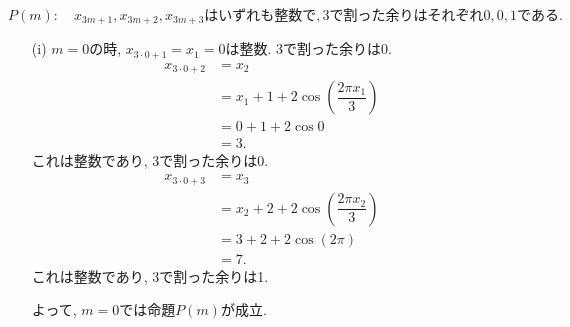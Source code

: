 \documentclass[dvipdfmx,a4paper]{jsarticle}
\begin{document}
    \begin{equation*}
        P(m): \quad x_{3m+1}, x_{3m+2}, x_{3m+3}
        \mathrm{はいずれも整数で, 3で割った余りはそれぞれ0, 0, 1である. }
    \end{equation*}
    
    
    \begin{itemize}
        \item [(i)] $m=0$の時, $x_{3\cdot 0 + 1} = x_1 = 0$は整数. 3で割った余りは0. 
        \begin{align*}
            x_{3\cdot 0 + 2} &= x_2 \\
            &= x_1 + 1 + 2\cos\left( \dfrac{2\pi x_1}{3} \right)\\
            &= 0 + 1 + 2 \cos 0\\
            &=3. 
        \end{align*}
        これは整数であり, 3で割った余りは0. 
        \begin{align*}
            x_{3\cdot 0 + 3} &= x_3 \\
            &= x_2 + 2  + 2\cos\left( \dfrac{2\pi x_2}{3} \right)\\
            &= 3 + 2 + 2 \cos \left(2\pi \right) \\
            &=7. 
        \end{align*}
        これは整数であり, 3で割った余りは1. 

        よって, $m=0$では命題$P(m)$が成立. 


\end{itemize}
\end{document}
